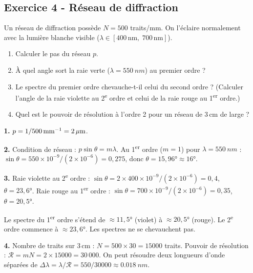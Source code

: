 \documentclass[12pt,a4paper]{article}
\begin{document}
\subsection*{Exercice 4 - Réseau de diffraction \niveau{\moyen}}

\begin{boiteexercice}
Un réseau de diffraction possède $N = 500$ traits/mm. On l'éclaire normalement avec la lumière blanche visible ($\lambda\in[400\,\text{nm},\;700\,\text{nm}]$).
\begin{enumerate}
  \item Calculer le pas du réseau $p$.
  \item À quel angle sort la raie verte ($\lambda=\qty{550}{nm}$) au premier ordre ?
  \item Le spectre du premier ordre chevauche-t-il celui du second ordre ? (Calculer l'angle de la raie violette au 2\textsuperscript{e} ordre et celui de la raie rouge au 1\textsuperscript{er} ordre.)
  \item Quel est le pouvoir de résolution à l'ordre 2 pour un réseau de 3\,cm de large ?
\end{enumerate}
\end{boiteexercice}

\begin{boitecorrige}
\textbf{1.} $p = 1/500\,\text{mm}^{-1} = \num{2}\,\mu\text{m}$.

\textbf{2.} Condition de réseau : $p\sin\theta = m\lambda$. Au 1\textsuperscript{er} ordre ($m=1$) pour $\lambda=\qty{550}{nm}$ :
$\sin\theta = 550\times10^{-9}/(2\times10^{-6}) = 0{,}275$, donc $\theta = 15{,}96°\approx16°$.

\textbf{3.} Raie violette au 2\textsuperscript{e} ordre : $\sin\theta = 2\times400\times10^{-9}/(2\times10^{-6}) = 0{,}4$, $\theta=23{,}6°$.
Raie rouge au 1\textsuperscript{er} ordre : $\sin\theta = 700\times10^{-9}/(2\times10^{-6}) = 0{,}35$, $\theta=20{,}5°$.

Le spectre du 1\textsuperscript{er} ordre s'étend de $\approx11{,}5°$ (violet) à $\approx20{,}5°$ (rouge). Le 2\textsuperscript{e} ordre commence à $\approx23{,}6°$. Les spectres ne se chevauchent pas.

\textbf{4.} Nombre de traits sur 3\,cm : $N = 500\times30 = 15000$ traits. Pouvoir de résolution : $\mathcal{R} = mN = 2\times15000 = 30\,000$. On peut résoudre deux longueurs d'onde séparées de $\Delta\lambda = \lambda/\mathcal{R} = 550/30000 \approx \qty{0.018}{nm}$.
\end{boitecorrige}
\end{document}
